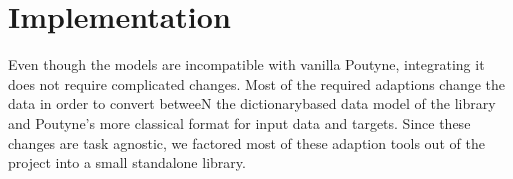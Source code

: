 \documentclass[letterpaper,10pt,english]{jupyterBook}
\begin{document}
\section{Implementation}
\label{\detokenize{Poutyne:implementation}}
\sphinxAtStartPar
Even though the  models are incompatible with vanilla Poutyne, integrating it does not require complicated changes.
Most of the required adaptions change the data in order to convert betweeN the dictionary\sphinxhyphen{}based data model of the  library and Poutyne’s more classical  format for input data and targets.
Since these changes are task agnostic, we factored most of these adaption tools out of the project into a small standalone library. %
\begin{footnote}[1]\sphinxAtStartFootnote
{}
%
\end{footnote}
\end{document}
